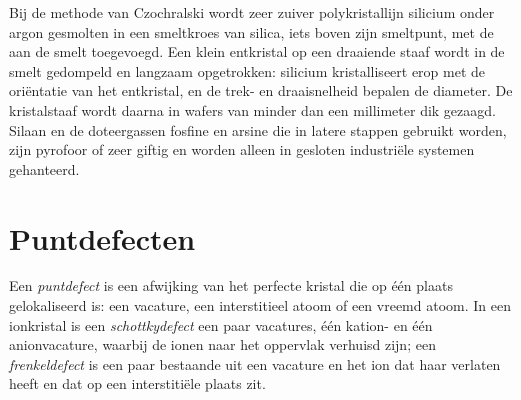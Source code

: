 \begin{inthelab}
Bij de methode van Czochralski wordt zeer zuiver polykristallijn
silicium onder argon gesmolten in een smeltkroes van silica, iets boven
zijn smeltpunt, met de  aan de smelt toegevoegd. Een klein
entkristal op een draaiende staaf wordt in de smelt gedompeld en langzaam
opgetrokken: silicium kristalliseert erop met de oriëntatie van het
entkristal, en de trek- en draaisnelheid bepalen de diameter. De
kristalstaaf wordt daarna in wafers van minder dan een millimeter dik
gezaagd. Silaan en de doteergassen fosfine en arsine die in latere
stappen gebruikt worden, zijn pyrofoor of zeer giftig en worden alleen
in gesloten industriële systemen gehanteerd.
\end{inthelab}

\section{Puntdefecten}

\begin{definition}[Puntdefecten]\label{def:b3:solid-state:defects}
Een \emph{puntdefect} is een afwijking van het perfecte
kristal die op één plaats gelokaliseerd is: een vacature, een
interstitieel atoom of een vreemd atoom. In een ionkristal is een
\emph{schottkydefect} een paar vacatures, één
kation- en één anionvacature, waarbij de ionen naar het oppervlak
verhuisd zijn; een \emph{frenkeldefect} is een paar
bestaande uit een vacature en het ion dat haar verlaten heeft en dat op
een interstitiële plaats zit.
\end{definition}

